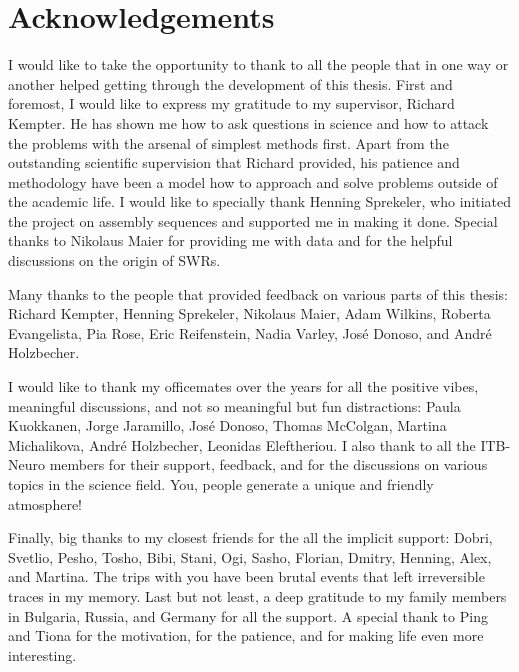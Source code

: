 \chapter*{Acknowledgements}

I would like to take the opportunity to thank to all the people that in one way
or another helped getting through the development of this thesis. First and
foremost, I would like to express my gratitude to my supervisor, Richard
Kempter. He has shown me how to ask questions in science and how to attack the
problems with the arsenal of simplest methods first. Apart from the outstanding
scientific supervision that Richard provided, his patience and methodology have
been a model how to approach and solve problems outside of the academic life. I
would like to specially thank Henning Sprekeler, who initiated the project on
assembly sequences and supported me in making it done. Special thanks to
Nikolaus Maier for providing me with data and for the helpful discussions on
the origin of SWRs.

Many thanks to the people that provided feedback on various parts of this
thesis: Richard Kempter, Henning Sprekeler, Nikolaus Maier, Adam Wilkins,
Roberta Evangelista, Pia Rose, Eric Reifenstein, Nadia Varley, Jos\'{e} Donoso,
and Andr\'{e} Holzbecher.

I would like to thank my officemates over the years for all the positive vibes,
meaningful discussions, and not so meaningful but fun distractions: Paula
Kuokkanen, Jorge Jaramillo, Jos\'{e} Donoso, Thomas McColgan, Martina
Michalikova, Andr\'{e} Holzbecher, Leonidas Eleftheriou. I also thank to all
the ITB-Neuro members for their support, feedback, and for the discussions on
various topics in the science field. You, people generate a unique and friendly
atmosphere!

Finally, big thanks to my closest friends for the all the implicit support:
Dobri, Svetlio, Pesho, Tosho, Bibi, Stani, Ogi, Sasho, Florian, Dmitry,
Henning, Alex, and Martina. The trips with you have been brutal events that
left irreversible traces in my memory. Last but not least, a deep gratitude to
my family members in Bulgaria, Russia, and Germany for all the support. A
special thank to Ping and Tiona for the motivation, for the patience, and for
making life even more interesting.


